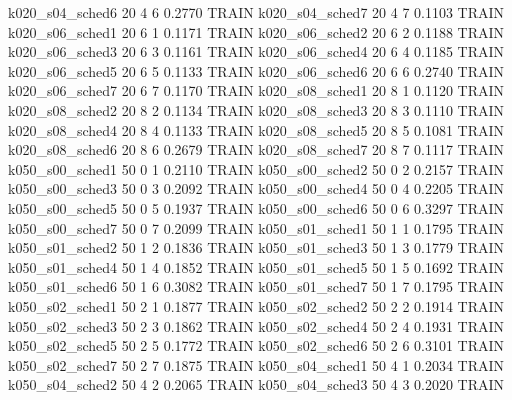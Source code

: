   k020_s04_sched6                   20    4   6    0.2770  TRAIN
  k020_s04_sched7                   20    4   7    0.1103  TRAIN
  k020_s06_sched1                   20    6   1    0.1171  TRAIN
  k020_s06_sched2                   20    6   2    0.1188  TRAIN
  k020_s06_sched3                   20    6   3    0.1161  TRAIN
  k020_s06_sched4                   20    6   4    0.1185  TRAIN
  k020_s06_sched5                   20    6   5    0.1133  TRAIN
  k020_s06_sched6                   20    6   6    0.2740  TRAIN
  k020_s06_sched7                   20    6   7    0.1170  TRAIN
  k020_s08_sched1                   20    8   1    0.1120  TRAIN
  k020_s08_sched2                   20    8   2    0.1134  TRAIN
  k020_s08_sched3                   20    8   3    0.1110  TRAIN
  k020_s08_sched4                   20    8   4    0.1133  TRAIN
  k020_s08_sched5                   20    8   5    0.1081  TRAIN
  k020_s08_sched6                   20    8   6    0.2679  TRAIN
  k020_s08_sched7                   20    8   7    0.1117  TRAIN
  k050_s00_sched1                   50    0   1    0.2110  TRAIN
  k050_s00_sched2                   50    0   2    0.2157  TRAIN
  k050_s00_sched3                   50    0   3    0.2092  TRAIN
  k050_s00_sched4                   50    0   4    0.2205  TRAIN
  k050_s00_sched5                   50    0   5    0.1937  TRAIN
  k050_s00_sched6                   50    0   6    0.3297  TRAIN
  k050_s00_sched7                   50    0   7    0.2099  TRAIN
  k050_s01_sched1                   50    1   1    0.1795  TRAIN
  k050_s01_sched2                   50    1   2    0.1836  TRAIN
  k050_s01_sched3                   50    1   3    0.1779  TRAIN
  k050_s01_sched4                   50    1   4    0.1852  TRAIN
  k050_s01_sched5                   50    1   5    0.1692  TRAIN
  k050_s01_sched6                   50    1   6    0.3082  TRAIN
  k050_s01_sched7                   50    1   7    0.1795  TRAIN
  k050_s02_sched1                   50    2   1    0.1877  TRAIN
  k050_s02_sched2                   50    2   2    0.1914  TRAIN
  k050_s02_sched3                   50    2   3    0.1862  TRAIN
  k050_s02_sched4                   50    2   4    0.1931  TRAIN
  k050_s02_sched5                   50    2   5    0.1772  TRAIN
  k050_s02_sched6                   50    2   6    0.3101  TRAIN
  k050_s02_sched7                   50    2   7    0.1875  TRAIN
  k050_s04_sched1                   50    4   1    0.2034  TRAIN
  k050_s04_sched2                   50    4   2    0.2065  TRAIN
  k050_s04_sched3                   50    4   3    0.2020  TRAIN
